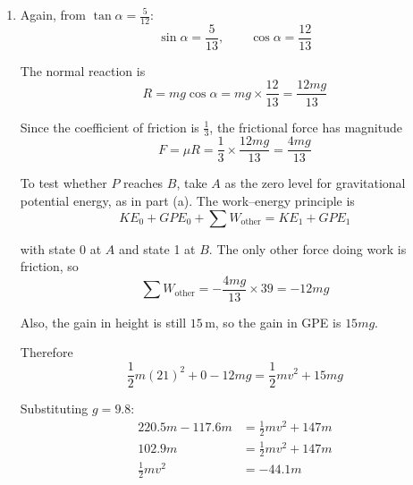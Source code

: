 \documentclass[leqno]{article}
\begin{document}
\begin{enumerate}[
  label=\textbf{\arabic*.},
  leftmargin=*,
  topsep=0pt,
  partopsep=0pt,
  parsep=0pt
]
\begin{djsSolution}
\begin{enumerate}[label=\textbf{(\alph*)}]
  The vertical height gained from $A$ to $B$ is
  \[
  39\sin\alpha=39\times\frac{5}{13}=15\,\mathrm{m}
  \]

  Take $A$ as the zero level for gravitational potential energy. The principle of conservation of mechanical energy is
  \[
  KE_0+GPE_0=KE_1+GPE_1
  \]

  with state 0 at $A$ and state 1 at $B$, so
  \[
  \frac12 m(21)^2+0=\frac12 mv^2+mg(15)
  \]

  With $g=9.8$:
  \begin{align*}
  \frac12 m(441) &= \frac12 mv^2 + 15mg \\
  220.5m &= \frac12 mv^2 + 147m \\
  \frac12 mv^2 &= 73.5m \\
  v^2 &= 147
  \end{align*}

  Hence
  \[
  v=\sqrt{147}=7\sqrt{3}\,\mathrm{m\,s}^{-1}
  \]

  So the speed of $P$ at $B$ is $7\sqrt{3}\,\mathrm{m\,s}^{-1}\approx 12.1\,\mathrm{m\,s}^{-1}$.

  \item Again, from $\tan\alpha=\frac{5}{12}$:
  \[
  \sin\alpha=\frac{5}{13}, \qquad \cos\alpha=\frac{12}{13}
  \]

  The normal reaction is
  \[
  R=mg\cos\alpha=mg\times\frac{12}{13}=\frac{12mg}{13}
  \]

  Since the coefficient of friction is $\frac13$, the frictional force has magnitude
  \[
  F=\mu R=\frac13\times\frac{12mg}{13}=\frac{4mg}{13}
  \]

  To test whether $P$ reaches $B$, take $A$ as the zero level for gravitational potential energy, as in part (a). The work--energy principle is
  \[
  KE_0+GPE_0+\sum W_{\text{other}}=KE_1+GPE_1
  \]

  with state 0 at $A$ and state 1 at $B$. The only other force doing work is friction, so
  \[
  \sum W_{\text{other}}=-\frac{4mg}{13}\times 39=-12mg
  \]

  Also, the gain in height is still $15\,\mathrm{m}$, so the gain in GPE is $15mg$.

  Therefore
  \[
  \frac12 m(21)^2+0-12mg=\frac12 mv^2+15mg
  \]

  Substituting $g=9.8$:
  \begin{align*}
  220.5m-117.6m &= \frac12 mv^2+147m \\
  102.9m &= \frac12 mv^2+147m \\
  \frac12 mv^2 &= -44.1m
  \end{align*}


\end{enumerate}
\end{djsSolution}
\end{enumerate}
\end{document}
